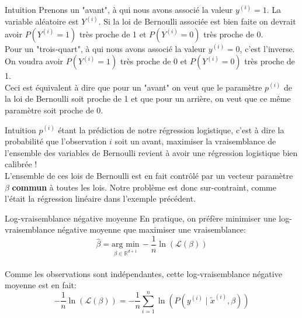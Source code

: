 \begin{frame}{Intuition}
	Prenons un "avant", à qui nous avons associé la valeur $y^{(i)}=1$. La variable aléatoire est $Y^{(i)}$. Si la loi de Bernoulli associée est bien faite on devrait avoir $P(Y^{(i)} = 1)$ très proche de 1 et $P(Y^{(i)} = 0)$ très proche de 0. \\
	\vspace{0.5cm}
	\pause
	Pour un "trois-quart", à qui nous avons associé la valeur $y^{(i)}=0$, c'est l'inverse. On voudra avoir $P(Y^{(i)} = 1)$ très proche de 0 et $P(Y^{(i)} = 0)$ très proche de 1. \\
	\vspace{0.5cm}
	\pause
	Ceci est équivalent à dire que pour un "avant" on veut que le paramètre $p^{(i)}$ de la loi de Bernoulli soit proche de 1 et que pour un arrière, on veut que ce même paramètre soit proche de 0. \\
\end{frame}

\begin{frame}{Intuition}
	$p^{(i)}$ étant la prédiction de notre régression logistique, c'est à dire la probabilité que l'observation $i$ soit un avant, maximiser la vraisemblance de l'ensemble des variables de Bernoulli revient à avoir une régression logistique bien calibrée ! \\
	\vspace{0.5cm}
	\pause
	L'ensemble de ces lois de Bernoulli est en fait contrôlé par un vecteur paramètre $\beta$ \textbf{commun} à toutes les lois. Notre problème est donc sur-contraint, comme l'était la régression linéaire dans l'exemple précédent.	
\end{frame}

\begin{frame}{Log-vraisemblance négative moyenne}
	En pratique, on préfère minimiser une log-vraisemblance négative moyenne que maximiser une vraisemblance:
	\begin{equation}
		\hat{\beta} = \underset{\beta \in \mathbb{R}^{d+1}}{\text{arg min}} \, - \frac{1}{n} \ln{\left(\mathcal{L}(\beta)\right)}
		\nonumber
	\end{equation} \\
	\vspace{0.5cm}
	\pause
	Comme les observations sont indépendantes, cette log-vraisemblance négative moyenne est en fait:
	\begin{equation}
		- \frac{1}{n}\ln{\left(\mathcal{L}(\beta)\right)} = - \frac{1}{n} \sum_{i=1}^n \ln{\left(P(y^{(i)} \mid \tilde{x}^{(i)}, \beta)\right)}
		\nonumber
	\end{equation}
\end{frame}

